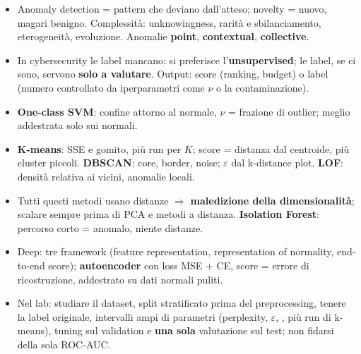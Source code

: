 \begin{sintesi}
\begin{itemize}
  \item Anomaly detection = pattern che deviano dall'atteso; novelty = nuovo, magari benigno. Complessità: unknowingness, rarità e
        sbilanciamento, eterogeneità, evoluzione. Anomalie \textbf{point}, \textbf{contextual}, \textbf{collective}.
  \item In cybersecurity le label mancano: si preferisce l'\textbf{unsupervised}; le label, se ci sono, servono \textbf{solo a valutare}.
        Output: score (ranking, budget) o label (numero controllato da iperparametri come $\nu$ o la contaminazione).
  \item \textbf{One-class SVM}: confine attorno al normale, $\nu$ = frazione di outlier; meglio addestrata solo sui normali.
  \item \textbf{K-means}: SSE e gomito, più run per $K$; score = distanza dal centroide, più cluster piccoli. \textbf{DBSCAN}: core,
        border, noise; $\varepsilon$ dal k-distance plot. \textbf{LOF}: densità relativa ai vicini, anomalie locali.
  \item Tutti questi metodi usano distanze $\Rightarrow$ \textbf{maledizione della dimensionalità}; scalare sempre prima di PCA e metodi a
        distanza. \textbf{Isolation Forest}: percorso corto = anomalo, niente distanze.
  \item Deep: tre framework (feature representation, representation of normality, end-to-end score); \textbf{autoencoder} con loss
        MSE + CE, score = errore di ricostruzione, addestrato su dati normali puliti.
  \item Nel lab: studiare il dataset, split stratificato prima del preprocessing, tenere la label originale, intervalli ampi di
        parametri (perplexity, $\varepsilon$, , più run di k-means), tuning sul validation e \textbf{una sola} valutazione
        sul test; non fidarsi della sola ROC-AUC.
\end{itemize}
\end{sintesi}
